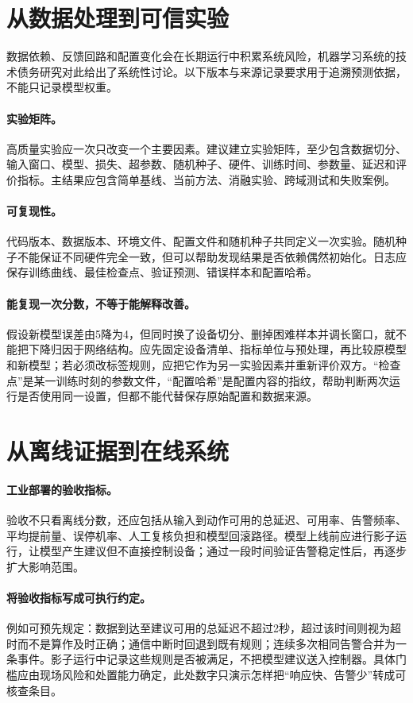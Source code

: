 \section{从数据处理到可信实验}
数据依赖、反馈回路和配置变化会在长期运行中积累系统风险，机器学习系统的技术债务研究对此给出了系统性讨论\cite{sculley2015debt}。以下版本与来源记录要求用于追溯预测依据，不能只记录模型权重。
\paragraph{实验矩阵。}
高质量实验应一次只改变一个主要因素。建议建立实验矩阵，至少包含数据切分、输入窗口、模型、损失、超参数、随机种子、硬件、训练时间、参数量、延迟和评价指标。主结果应包含简单基线、当前方法、消融实验、跨域测试和失败案例。

\paragraph{可复现性。}
代码版本、数据版本、环境文件、配置文件和随机种子共同定义一次实验。随机种子不能保证不同硬件完全一致，但可以帮助发现结果是否依赖偶然初始化。日志应保存训练曲线、最佳检查点、验证预测、错误样本和配置哈希。

\paragraph{能复现一次分数，不等于能解释改善。}
假设新模型误差由5降为4，但同时换了设备切分、删掉困难样本并调长窗口，就不能把下降归因于网络结构。应先固定设备清单、指标单位与预处理，再比较原模型和新模型；若必须改标签规则，应把它作为另一实验因素并重新评价双方。“检查点”是某一训练时刻的参数文件，“配置哈希”是配置内容的指纹，帮助判断两次运行是否使用同一设置，但都不能代替保存原始配置和数据来源。

\section{从离线证据到在线系统}
\paragraph{工业部署的验收指标。}
验收不只看离线分数，还应包括从输入到动作可用的总延迟、可用率、告警频率、平均提前量、误停机率、人工复核负担和模型回滚路径。模型上线前应进行影子运行，让模型产生建议但不直接控制设备；通过一段时间验证告警稳定性后，再逐步扩大影响范围。

\paragraph{将验收指标写成可执行约定。}
例如可预先规定：数据到达至建议可用的总延迟不超过2秒，超过该时间则视为超时而不是算作及时正确；通信中断时回退到既有规则；连续多次相同告警合并为一条事件。影子运行中记录这些规则是否被满足，不把模型建议送入控制器。具体门槛应由现场风险和处置能力确定，此处数字只演示怎样把“响应快、告警少”转成可核查条目。

